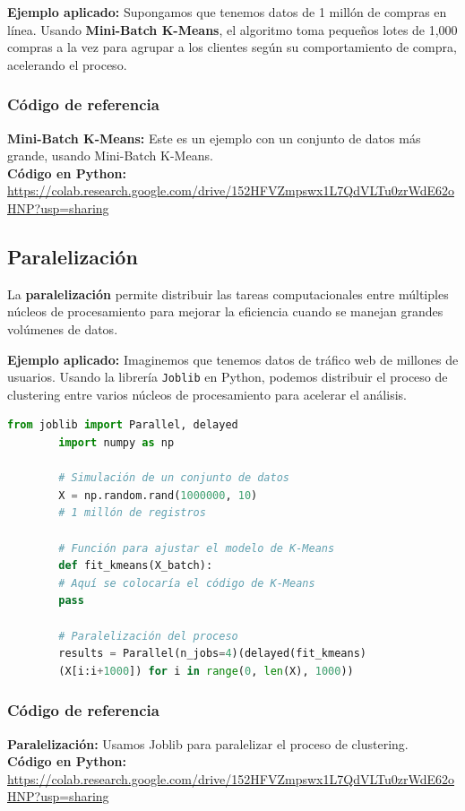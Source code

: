 \documentclass[12pt]{book}
\begin{document}
	\textbf{Ejemplo aplicado:}
	Supongamos que tenemos datos de 1 millón de compras en línea. Usando \textbf{Mini-Batch K-Means}, el algoritmo toma pequeños lotes de 1,000 compras a la vez para agrupar a los clientes según su comportamiento de compra, acelerando el proceso.
	\subsubsection*{Código de referencia}
	\textbf{Mini-Batch K-Means:} Este es un ejemplo con un conjunto de datos más grande, usando Mini-Batch K-Means. \\
	\textbf{Código en Python:} \\ \url{https://colab.research.google.com/drive/152HFVZmpswx1L7QdVLTu0zrWdE62oHNP?usp=sharing}
	
	\subsection{Paralelización}
	La \textbf{paralelización} permite distribuir las tareas computacionales entre múltiples núcleos de procesamiento para mejorar la eficiencia cuando se manejan grandes volúmenes de datos.
	
	\textbf{Ejemplo aplicado:}
	Imaginemos que tenemos datos de tráfico web de millones de usuarios. Usando la librería \texttt{Joblib} en Python, podemos distribuir el proceso de clustering entre varios núcleos de procesamiento para acelerar el análisis.
	
	\begin{lstlisting}[language=Python]
		from joblib import Parallel, delayed
		import numpy as np
		
		# Simulación de un conjunto de datos
		X = np.random.rand(1000000, 10) 
		# 1 millón de registros
		
		# Función para ajustar el modelo de K-Means
		def fit_kmeans(X_batch):
		# Aquí se colocaría el código de K-Means
		pass
		
		# Paralelización del proceso
		results = Parallel(n_jobs=4)(delayed(fit_kmeans)
		(X[i:i+1000]) for i in range(0, len(X), 1000))
	\end{lstlisting}
	\subsubsection*{Código de referencia}
	\textbf{Paralelización:} Usamos Joblib para paralelizar el proceso de clustering. \\
	\textbf{Código en Python:} \\ \url{https://colab.research.google.com/drive/152HFVZmpswx1L7QdVLTu0zrWdE62oHNP?usp=sharing}
	
\end{document}
